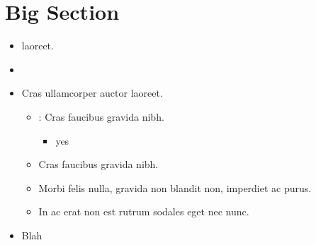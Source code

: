 \documentclass[12pt,a4paper]{report}
\begin{document}
\section{Big Section}
\begin{itemize}
        \item {} laoreet. 
        \item {}
        \item Cras ullamcorper auctor laoreet.
    \begin{itemize}
    \subsection{Mini Section}
        \item {}: Cras faucibus gravida nibh.
            \begin{itemize}
                \item yes
            \end{itemize}
        \item  Cras faucibus gravida nibh.
        \item  Morbi felis nulla, gravida non blandit non, imperdiet ac purus.
        \item  In ac erat non est rutrum sodales eget nec nunc.
    \end{itemize}
    \item Blah
\end{itemize}
\end{document}
